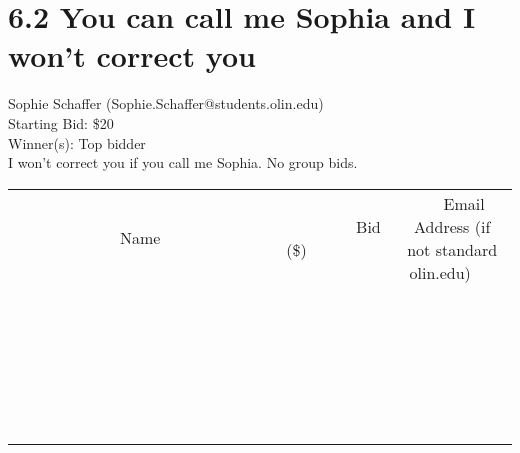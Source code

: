 \documentclass[11pt]{article}
\begin{document}
					\section*{6.2 You can call me Sophia and I won't correct you}
					Sophie Schaffer (Sophie.Schaffer@students.olin.edu) \\
					Starting Bid: \$20 \\
					Winner(s): Top bidder \\
					I won't correct you if you call me Sophia. No group bids. \\
					[6ex]
					\begin{tabular}{c c c}
						~~~~~~~~~~~~~Name~~~~~~~~~~~~~ & ~~~~~~~~~Bid (\$)~~~~~~~~~ & ~~~Email Address (if not standard olin.edu)~~~ \\
				
 & & \\
\hline
 & & \\
\hline
 & & \\
\hline
 & & \\
\hline
 & & \\
\hline
 & & \\
\hline
 & & \\
\hline
 & & \\
\hline
 & & \\
\hline
 & & \\
\hline
 & & \\
\hline
 & & \\
\hline
 & & \\
\hline
 & & \\
\hline
 & & \\
\hline
 & & \\
\hline
 & & \\
\hline
 & & \\
\hline
 & & \\
\hline
 & & \\
\hline
 & & \\
\hline
 & & \\
\hline
 & & \\
\hline
 & & \\
\hline
 & & \\
\hline
 & & \\
\hline
					\end{tabular}
					\clearpage
				
\end{document}
